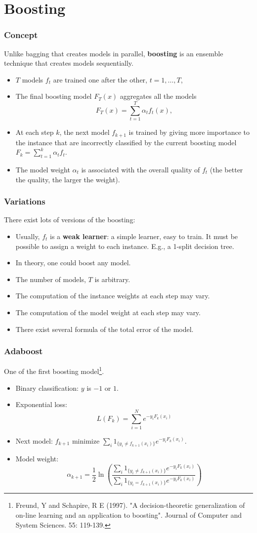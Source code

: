 \section{Boosting}
\begin{frame}
\frametitle{Concept}
Unlike bagging that creates models in parallel, {\bf boosting} is an ensemble technique that creates models sequentially. 
\begin{itemize}
\item $T$ models $f_t$ are trained one after the other, $t=1,\ldots,T$,
\item The final boosting model $F_T(x)$ aggregates all the models
$$
F_T(x) = \sum_{t=1}^T \alpha_t f_t(x),
$$
\item At each step $k$, the next model $f_{k+1}$ is trained by giving more importance to the instance that are incorrectly classified by the current boosting model $F_k=\sum_{t=1}^k \alpha_t f_t$.
\item The model weight $\alpha_t$ is associated with the overall quality of $f_t$ (the better the quality, the larger the weight).
\end{itemize} 
\end{frame}
\begin{frame}
\frametitle{Variations}
There exist lots of versions of the boosting:
\begin{itemize}
\item Usually, $f_t$ is a {\bf weak learner}: a simple learner, easy to train. It must be possible to assign a weight to each instance. E.g., a 1-split decision tree. 
\item In theory, one could boost any model.
\item The number of models, $T$ is arbitrary.
\item The computation of the instance weights at each step may vary.
\item The computation of the model weight at each step may vary.
\item There exist several formula of the total error of the model. 
\end{itemize} 
\end{frame}
\begin{frame}
\frametitle{Adaboost}
One of the first boosting model\footnote{Freund, Y and Schapire, R E (1997). "A decision-theoretic generalization of on-line learning and an application to boosting". Journal of Computer and System Sciences. 55: 119-139.}. 
\begin{itemize}
\item Binary classification: $y$ is $-1$ or $1$.
\item Exponential loss: 
$$
L(F_k) = \sum_{i=1}^N e^{-y_i F_k(x_i)}
$$
\item Next model: $f_{k+1}$ minimize $\sum_i 1_{\{y_i \neq f_{k+1}(x_i)\}} e^{-y_i F_{k}(x_i)}$.
\item Model weight: 
$$
\alpha_{k+1} = \frac{1}{2} \ln \left(\frac{\sum_i 1_{\{y_i \neq f_{k+1}(x_i)\}} e^{-y_i F_{k}(x_i)}}{\sum_i 1_{\{y_i = f_{k+1}(x_i)\}} e^{-y_i F_{k}(x_i)}}\right)
$$ 
\end{itemize}
\end{frame}
